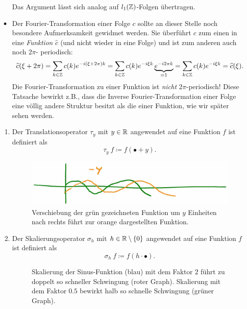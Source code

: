 \begin{remark}
\begin{itemize}
\[\]
Das Argument lässt sich analog auf $ l_{1}(\mathbb{Z}) $-Folgen übertragen.
\item Der Fourier-Transformation einer Folge $ c $ sollte an dieser Stelle noch besondere 
  Aufmerksamkeit gewidmet werden. Sie überführt $ c $ zum einen in eine \emph{Funktion
  $ \widehat{c} $} (und nicht wieder in eine Folge) und ist zum anderen auch noch $ 2\pi $-%
  periodisch:
  \[
      \widehat{c}(\xi + 2\pi) 
    = \sum_{k \in \mathbb{Z}} c(k) e^{-i(\xi + 2\pi)k}
    = \sum_{k \in \mathbb{Z}} c(k) e^{-i\xi k} \underbrace{e^{-i 2\pi k}}_{= 1}
    = \sum_{k \in \mathbb{Z}} c(k) e^{-i\xi k}
    = \widehat{c}(\xi).
  \]
  Die Fourier-Transformation zu einer Funktion ist \emph{nicht} $ 2\pi $-periodisch! Diese Tatsache 
  bewirkt z.B., dass die Inverse Fourier-Transformation einer Folge eine völlig andere Struktur
  besitzt als die einer Funktion, wie wir später sehen werden.
\end{itemize}
\end{remark}

\begin{definition} \leavevmode
\begin{enumerate}
\item Der Translationsoperator $ \tau_{y} $ mit $ y \in \mathbb{R} $ angewendet auf eine Funktion $ f $ ist 
definiert als
\[ \tau_{y} \ f \coloneqq f(\bullet + y). \]
\begin{figure}[h]
	\centering
	\includegraphics[width=0.5\linewidth]{Bilder/translation}
	\caption{Verschiebung der grün gezeichneten Funktion um $ y $ Einheiten nach rechts führt zur
  	orange dargestellten Funktion.}
	\label{fig:translation}
\end{figure}
\item Der Skalierungsoperator $ \sigma_{h} $ mit $ h \in \mathbb{R} \setminus \{ 0 \} $ angewendet auf eine 
Funktion $ f $ ist definiert als
\[ \sigma_{h} \ f \coloneqq f(h \cdot \bullet). \]
\begin{figure}[ht]
	\centering
	\caption{Skalierung der Sinus-Funktion (blau) mit dem Faktor $ 2 $ führt zu doppelt so schneller
  	Schwingung (roter Graph). Skalierung mit dem Faktor $ 0.5 $ bewirkt halb so schnelle
  	Schwingung (grüner Graph).}
	\label{fig:skalierung}
\end{figure}
\end{enumerate}
\end{definition}

